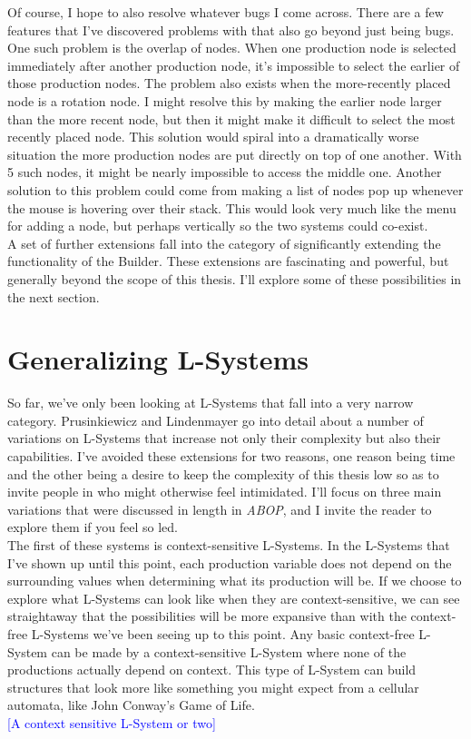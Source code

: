 \documentclass[12pt,twoside]{reedthesis}
\begin{document}
	Of course, I hope to also resolve whatever bugs I come across. There are a few features that I've discovered problems with that also go beyond just being bugs. One such problem is the overlap of nodes. When one production node is selected immediately after another production node, it's impossible to select the earlier of those production nodes. The problem also exists when the more-recently placed node is a rotation node. I might resolve this by making the earlier node larger than the more recent node, but then it might make it difficult to select the most recently placed node. This solution would spiral into a dramatically worse situation the more production nodes are put directly on top of one another. With 5 such nodes, it might be nearly impossible to access the middle one. Another solution to this problem could come from making a list of nodes pop up whenever the mouse is hovering over their stack. This would look very much like the menu for adding a node, but perhaps vertically so the two systems could co-exist.\\
	
	A set of further extensions fall into the category of significantly extending the functionality of the Builder. These extensions are fascinating and powerful, but generally beyond the scope of this thesis. I'll explore some of these possibilities in the next section.\\

\section{Generalizing L-Systems}
So far, we've only been looking at L-Systems that fall into a very narrow category. Prusinkiewicz and Lindenmayer go into detail about a number of variations on L-Systems that increase not only their complexity but also their capabilities. I've avoided these extensions for two reasons, one reason being time and the other being a desire to keep the complexity of this thesis low so as to invite people in who might otherwise feel intimidated. I'll focus on three main variations that were discussed in length in \textit{ABOP}, and I invite the reader to explore them if you feel so led.\\

	The first of these systems is context-sensitive L-Systems. In the L-Systems that I've shown up until this point, each production variable does not depend on the surrounding values when determining what its production will be. If we choose to explore what L-Systems can look like when they are context-sensitive, we can see straightaway that the possibilities will be more expansive than with the context-free L-Systems we've been seeing up to this point. Any basic context-free L-System can be made by a context-sensitive L-System where none of the productions actually depend on context. This type of L-System can build structures that look more like something you might expect from a cellular automata, like John Conway's Game of Life.\\
	\textcolor{blue}{[A context sensitive L-System or two]}\\
	
\end{document}
